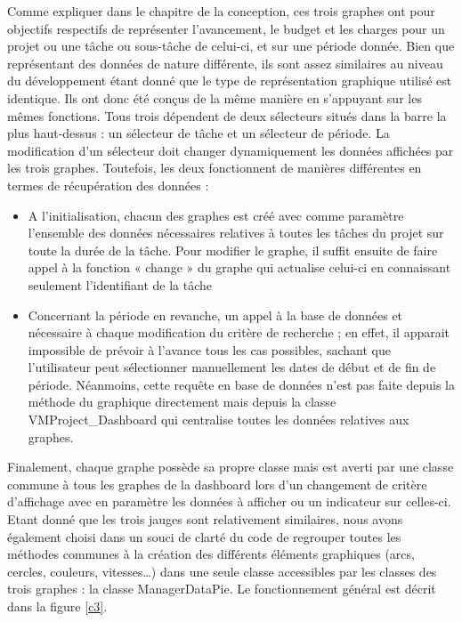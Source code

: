 \documentclass[12pt]{report}
\begin{document}
	Comme expliquer dans le chapitre de la conception, ces trois graphes ont pour objectifs respectifs de représenter l’avancement, le budget et les charges pour un projet ou une tâche ou sous-tâche de celui-ci, et sur une période donnée. Bien que représentant des données de nature différente, ils sont assez similaires au niveau du développement étant donné que le type de représentation graphique utilisé est identique. Ils ont donc été conçus de la même manière en s’appuyant sur les mêmes fonctions. Tous trois dépendent de deux sélecteurs situés dans la barre la plus haut-dessus : un sélecteur de tâche et un sélecteur de période. La modification d’un sélecteur doit changer dynamiquement les données affichées par les trois graphes. Toutefois, les deux fonctionnent de manières différentes en termes de récupération des données :\\
	
\begin{itemize} 
\item A l’initialisation, chacun des graphes est créé avec comme paramètre l’ensemble des données nécessaires relatives à toutes les tâches du projet sur toute la durée de la tâche. Pour modifier le graphe, il suffit ensuite de faire appel à la fonction « change » du graphe qui actualise celui-ci en connaissant seulement l’identifiant de la tâche
\item	Concernant la période en revanche, un appel à la base de données et nécessaire à chaque modification du critère de recherche ; en effet, il apparait impossible de prévoir à l’avance tous les cas possibles, sachant que l’utilisateur peut sélectionner manuellement les dates de début et de fin de période. Néanmoins, cette requête en base de données n’est pas faite depuis la méthode du graphique directement mais depuis la classe VMProject\_Dashboard qui centralise toutes les données relatives aux graphes.\\
\end{itemize}

Finalement, chaque graphe possède sa propre classe mais est averti par une classe commune à tous les graphes de la dashboard lors d’un changement de critère d’affichage avec en paramètre les données à afficher ou un indicateur sur celles-ci. Etant donné que les trois jauges sont relativement similaires, nous avons également choisi dans un souci de clarté du code de regrouper toutes les méthodes communes à la création des différents éléments graphiques (arcs, cercles, couleurs, vitesses…) dans une seule classe accessibles par les classes des trois graphes : la classe ManagerDataPie. Le fonctionnement général est décrit dans la figure \ref{c3}.  
\end{document}
